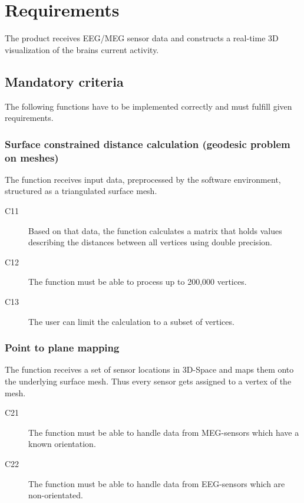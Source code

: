 \section{Requirements}
The product receives EEG/MEG sensor data and constructs a real-time 3D visualization of the brains current activity.

\subsection{Mandatory criteria}
The following functions have to be implemented correctly and must fulfill given requirements.
\subsubsection{Surface constrained distance calculation (geodesic problem on meshes)}
The function receives input data, preprocessed by the software environment, structured as a triangulated surface mesh.%


\begin{description}
	\item[C11] Based on that data, the function calculates a matrix that holds values describing the distances between all vertices using double precision. 
	\item[C12] The function must be able to process up to 200,000 vertices.
	\item[C13] The user can limit the calculation to a subset of vertices.
\end{description}

\subsubsection{Point to plane mapping}


The function receives a set of sensor locations in 3D-Space and maps them onto the underlying surface mesh. Thus every sensor gets assigned to a vertex of the mesh. 


\begin{description}
	\item[C21] The function must be able to handle data from MEG-sensors which have a known orientation.
	
	\item[C22] The function must be able to handle data from EEG-sensors which are non-orientated.
\end{description}

